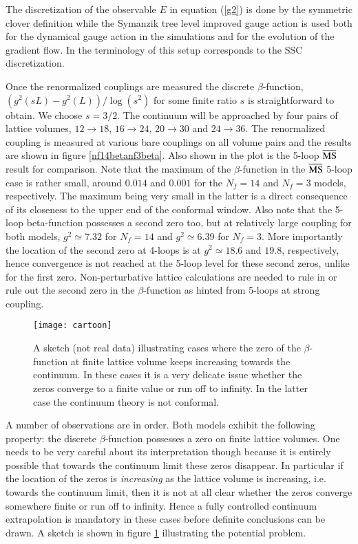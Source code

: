 \documentclass[epj]{webofc}
\def\msbar{\overline{\rm MS\kern-0.5pt}\kern0.5pt}
\begin{document}
The discretization of the observable $E$ in equation (\ref{g2}) is done by the symmetric clover definition while the Symanzik tree
level improved gauge action is used both for the dynamical gauge action in the simulations and for the evolution of the
gradient flow. In the terminology of \cite{Fodor:2014cxa, Fodor:2014cpa} this setup corresponds to the SSC discretization.

Once the renormalized couplings are measured the discrete $\beta$-function, $( g^2(sL) - g^2(L) ) / \log( s^2 )$ 
for some finite ratio $s$ is straightforward to obtain. 
We choose $s=3/2$. The continuum will be approached by four pairs of lattice volumes, $12 \to 18$, $16 \to 24$, $20
\to 30$ and $24 \to 36$. The renormalized coupling is measured at various bare couplings on all volume pairs and the
results are shown in figure \ref{nf14betanf3beta}. Also shown in the plot is the
5-loop $\msbar$ result for comparison. Note that the maximum of the $\beta$-function in the $\msbar$ 5-loop case is
rather small, around $0.014$ and $0.001$ for the $N_f = 14$ and $N_f = 3$ models, respectively. The maximum being very
small in the latter is a direct consequence of its closeness to the upper end of the conformal window. Also note that 
the 5-loop beta-function possesses a second zero too, but at relatively
large coupling for both models, $g^2 \simeq 7.32$ for $N_f=14$ and $g^2 \simeq 6.39$ for $N_f=3$.
More importantly the location of the second zero at 4-loops is at $g^2 \simeq 18.6$
and $19.8$, respectively, hence convergence is not reached at the 5-loop level for
these second zeros, unlike for the first zero. Non-perturbative lattice calculations are needed to rule in
or rule out the second zero in the $\beta$-function as hinted from 5-loops at
strong coupling. 


\begin{figure}
\centering
\texttt{[image: cartoon]}
\caption{A sketch (not real data) illustrating cases where the zero of the $\beta$-function at finite lattice volume
keeps increasing towards the continuum. In these cases it is a very delicate issue whether the zeros converge to a
finite value or run off to infinity. In the latter case the continuum theory is not conformal.}
\label{cartoon}
\end{figure}

A number of observations are in order. Both models exhibit the following property: the discrete $\beta$-function
possesses a zero on finite lattice volumes. One needs to be very careful about its interpretation though because it
is entirely possible that towards the continuum limit these zeros disappear. In particular if the location of the zeros is
{\em increasing} as the lattice volume is increasing, i.e. towards the continuum limit, then it is not at all clear whether
the zeros converge somewhere finite or run off to infinity. Hence a fully controlled continuum extrapolation is
mandatory in these cases before definite conclusions can be drawn. A sketch is shown in figure \ref{cartoon}
illustrating the potential problem.
\end{document}

